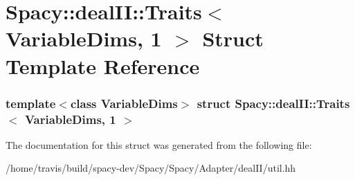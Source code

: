 \hypertarget{structSpacy_1_1dealII_1_1Traits_3_01VariableDims_00_011_01_4}{\section{\-Spacy\-:\-:deal\-I\-I\-:\-:\-Traits$<$ \-Variable\-Dims, 1 $>$ \-Struct \-Template \-Reference}
\label{structSpacy_1_1dealII_1_1Traits_3_01VariableDims_00_011_01_4}
}
\subsubsection*{template$<$class Variable\-Dims$>$ struct Spacy\-::deal\-I\-I\-::\-Traits$<$ Variable\-Dims, 1 $>$}



\-The documentation for this struct was generated from the following file\-:\begin{DoxyCompactItemize}
\item 
/home/travis/build/spacy-\/dev/\-Spacy/\-Spacy/\-Adapter/deal\-I\-I/util.\-hh\end{DoxyCompactItemize}
